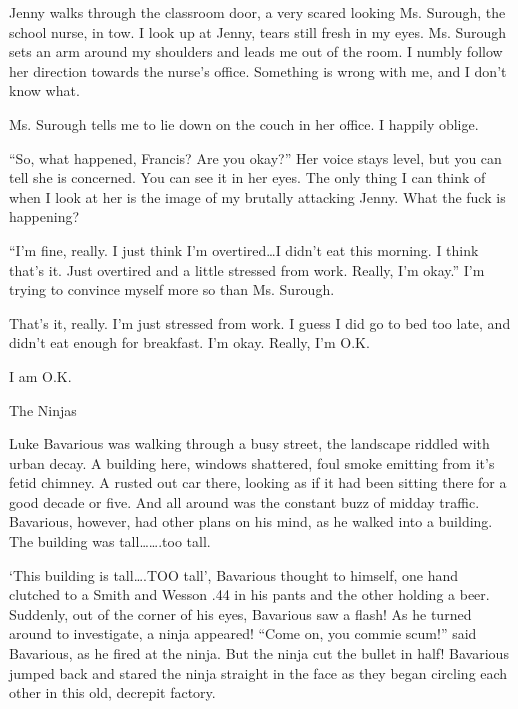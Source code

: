 Jenny walks through the classroom door, a very scared looking Ms.
Surough, the school nurse, in tow. I look up at Jenny, tears still
fresh in my eyes. Ms. Surough sets an arm around my shoulders and
leads me out of the room. I numbly follow her direction towards the
nurse's office. Something is wrong with me, and I don't
know what.

Ms. Surough tells me to lie down on the couch in her office. I
happily oblige.

``So, what happened, Francis? Are you okay?'' Her voice
stays level, but you can tell she is concerned. You can see it in
her eyes. The only thing I can think of when I look at her is the
image of my brutally attacking Jenny. What the fuck is
happening?

``I'm fine, really. I just think I'm
overtired{\ldots}I didn't eat this morning. I think
that's it. Just overtired and a little stressed from work.
Really, I'm okay.'' I'm trying to convince myself
more so than Ms. Surough.

That's it, really. I'm just stressed from work. I guess
I did go to bed too late, and didn't eat enough for
breakfast. I'm okay. Really, I'm O.K.

I am O.K. 
 





The Ninjas



Luke Bavarious was walking through a busy street, the landscape
riddled with urban decay. A building here, windows shattered, foul
smoke emitting from it's fetid chimney. A rusted out car
there, looking as if it had been sitting there for a good decade or
five. And all around was the constant buzz of midday traffic.
Bavarious, however, had other plans on his mind, as he walked into
a building. The building was tall{\ldots}{\ldots}.too tall.



`This building is tall{\ldots}.TOO tall', Bavarious
thought to himself, one hand clutched to a Smith and Wesson .44 in
his pants and the other holding a beer. Suddenly, out of the corner
of his eyes, Bavarious saw a flash! As he turned around to
investigate, a ninja appeared! ``Come on, you commie
scum!'' said Bavarious, as he fired at the ninja. But the
ninja cut the bullet in half! Bavarious jumped back and stared the
ninja straight in the face as they began circling each other in
this old, decrepit factory.



